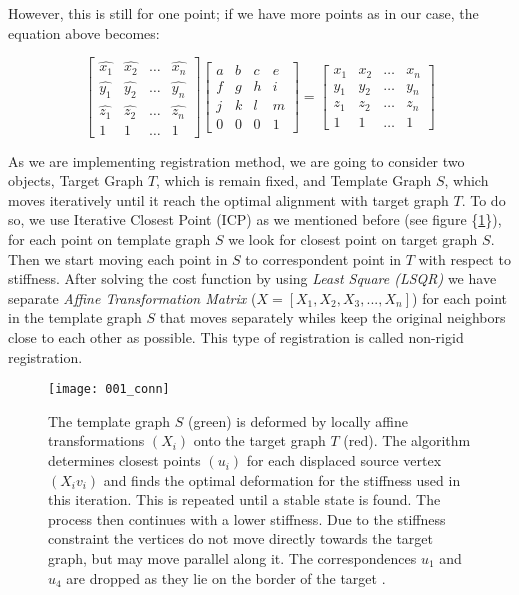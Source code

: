 \documentclass[../structure.tex]{subfiles}
\begin{document}
However,  this is still for one point; if we have more points as in our case, the equation above becomes:

\begin{equation*}
\begin{bmatrix}
\hat{x_{1}} & \hat{x_{2}} & \dots & \hat{x_{n}}\\
\hat{y_{1}} & \hat{y_{2}} & \dots & \hat{y_{n}}\\
\hat{z_{1}} & \hat{z_{2}} & \dots & \hat{z_{n}}\\
1 & 1 & \dots & 1
\end{bmatrix}
\begin{bmatrix}
a & b & c & e\\
f & g & h & i\\
j & k & l & m\\
0 & 0 & 0 & 1
\end{bmatrix}
=
\begin{bmatrix}
x_{1} & x_{2} & \dots & x_{n}\\
y_{1} & y_{2} & \dots & y_{n}\\
z_{1} & z_{2} & \dots & z_{n}\\
1 & 1 & \dots & 1
\end{bmatrix}
\end{equation*}

\hspace{2em}As we are implementing registration method, we are going to consider two objects, Target Graph $T$, which is remain fixed, and Template Graph $S$, which moves iteratively until it reach the optimal alignment with target graph $T$. To do so, we use Iterative Closest Point (ICP) as we mentioned before (see figure \{\ref{fig:icp}\}), for each point on template graph $S$ we look for closest point on target graph $S$. Then we start moving each point in $S$ to correspondent point in $T$ with respect to stiffness. After solving the cost function by using \textit{Least Square (LSQR)} we have separate \textit{Affine Transformation Matrix} ($X = [X_{1}, X_{2}, X_{3}, ...,X_{n}]$) for each point in the template graph $S$ that moves separately whiles keep the original neighbors close to each other as possible. This type of registration is called non-rigid registration.

\begin{figure}[h!]
\centering
\texttt{[image: 001\_conn]}
\captionsetup{justification=centering}
\caption{The template graph $S$ (green) is deformed by locally affine transformations $(X_{i})$ onto the target graph $T$ (red). The algorithm determines closest points $(u_{i})$ for each displaced source vertex $(X_{i}v_{i})$ and finds the optimal deformation for the stiffness used in this iteration. This is repeated until a stable state is found. The process then continues with a lower stiffness. Due to the stiffness constraint the vertices do not move directly towards the target graph, but may move parallel along it. The correspondences $u_{1}$
and $u_{4}$ are dropped as they lie on the border of the target \cite{Amberg2007}.}
\label{fig:icp}
\end{figure}
\end{document}
